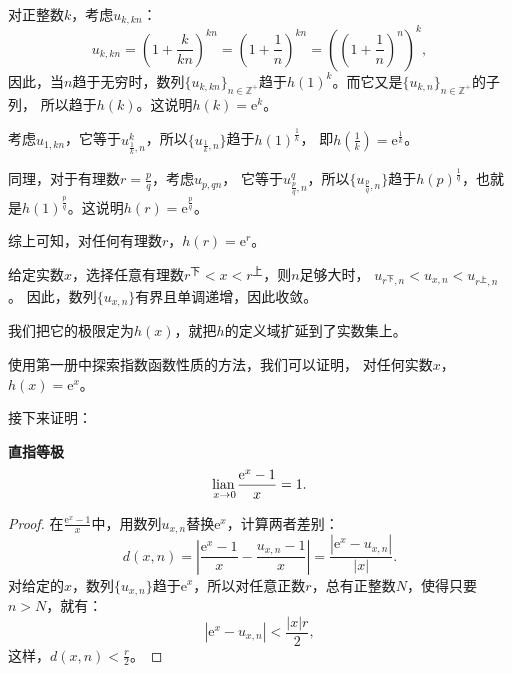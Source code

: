 \documentclass[12pt,UTF8]{ctexbook}
\begin{document}
\begin{appendix}
对正整数$k$，考虑$u_{k,kn}$：
$$ u_{k,kn} = \left(1 + \frac{k}{kn}\right)^{kn} = \left(1 + \frac{1}{n}\right)^{kn} = \left(\left(1 + \frac{1}{n}\right)^{n}\right)^{k}, $$
因此，当$n$趋于无穷时，数列$\{u_{k,kn}\}_{n\in\mathbb{Z}^+}$趋于$h(1)^k$。而它又是$\{u_{k,n}\}_{n\in\mathbb{Z}^+}$的子列，
所以趋于$h(k)$。这说明$h(k) = \mathrm{e}^k$。

考虑$u_{1,kn}$，它等于$u_{\frac{1}{k},n}^k$，所以$\{u_{\frac{1}{k},n}\}$趋于$h(1)^{\frac{1}{k}}$，
即$h(\frac{1}{k}) = \mathrm{e}^{\frac{1}{k}}$。

同理，对于有理数$r = \frac{p}{q}$，考虑$u_{p,qn}$，
它等于$u_{\frac{p}{q},n}^q$，所以$\{u_{\frac{p}{q},n}\}$趋于$h(p)^{\frac{1}{q}}$，也就是$h(1)^{\frac{p}{q}}$。这说明$h(r) = \mathrm{e}^{\frac{p}{q}}$。

综上可知，对任何有理数$r$，$h(r) = \mathrm{e}^r$。

给定实数$x$，选择任意有理数$r^{\text{下}} < x < r^{\text{上}}$，则$n$足够大时，
$u_{r^\text{下},n} < u_{x,n} < u_{r^\text{上},n}$。
因此，数列$\{u_{x,n}\}$有界且单调递增，因此收敛。

我们把它的极限定为$h(x)$，就把$h$的定义域扩延到了实数集上。

使用第一册中探索指数函数性质的方法，我们可以证明，
对任何实数$x$，$h(x) = \mathrm{e}^x$。

接下来证明：
\begin{tm}{\textbf{直指等极}}\label{tm:b-1-50}
    $$\underset{x\to 0}{\operatorname{lian}\,} \frac{\mathrm{e}^x - 1}{x} = 1.$$
\end{tm}

\begin{proof}
    在$\frac{\mathrm{e}^x - 1}{x}$中，用数列$u_{x,n}$替换$\mathrm{e}^x$，计算两者差别：
    $$ d(x, n) = \left|\frac{\mathrm{e}^x - 1}{x} - \frac{u_{x,n} - 1}{x}\right| = \frac{\left|\mathrm{e}^x - u_{x,n}\right|}{\left|x\right|}. $$
    对给定的$x$，数列$\{u_{x,n}\}$趋于$\mathrm{e}^x$，所以对任意正数$r$，总有正整数$N$，使得只要$n>N$，就有：
    $$ \left|\mathrm{e}^x - u_{x,n}\right| < \frac{|x|r}{2},$$
    这样，$d(x, n) < \frac{r}{2}$。


\end{proof}
\end{appendix}
\end{document}
